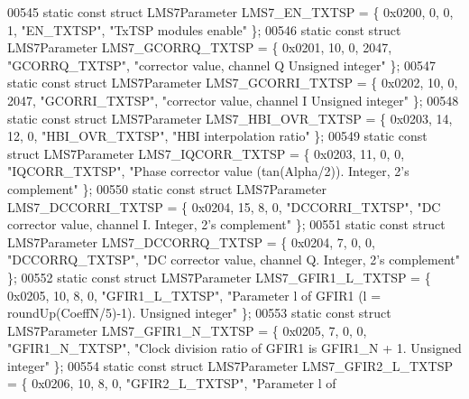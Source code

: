 \begin{DoxyCode}
00545 \textcolor{keyword}{static} \textcolor{keyword}{const} \textcolor{keyword}{struct }LMS7Parameter LMS7_EN_TXTSP = \{ 0x0200, 0, 0, 1, \textcolor{stringliteral}{"EN\_TXTSP"}, \textcolor{stringliteral}{"TxTSP modules enable"} \};
00546 \textcolor{keyword}{static} \textcolor{keyword}{const} \textcolor{keyword}{struct }LMS7Parameter LMS7_GCORRQ_TXTSP = \{ 0x0201, 10, 0, 2047, \textcolor{stringliteral}{"GCORRQ\_TXTSP"}, \textcolor{stringliteral}{"corrector
       value, channel Q Unsigned integer"} \};
00547 \textcolor{keyword}{static} \textcolor{keyword}{const} \textcolor{keyword}{struct }LMS7Parameter LMS7_GCORRI_TXTSP = \{ 0x0202, 10, 0, 2047, \textcolor{stringliteral}{"GCORRI\_TXTSP"}, \textcolor{stringliteral}{"corrector
       value, channel I Unsigned integer"} \};
00548 \textcolor{keyword}{static} \textcolor{keyword}{const} \textcolor{keyword}{struct }LMS7Parameter LMS7_HBI_OVR_TXTSP = \{ 0x0203, 14, 12, 0, \textcolor{stringliteral}{"HBI\_OVR\_TXTSP"}, \textcolor{stringliteral}{"HBI
       interpolation ratio"} \};
00549 \textcolor{keyword}{static} \textcolor{keyword}{const} \textcolor{keyword}{struct }LMS7Parameter LMS7_IQCORR_TXTSP = \{ 0x0203, 11, 0, 0, \textcolor{stringliteral}{"IQCORR\_TXTSP"}, \textcolor{stringliteral}{"Phase corrector
       value (tan(Alpha/2)). Integer, 2's complement"} \};
00550 \textcolor{keyword}{static} \textcolor{keyword}{const} \textcolor{keyword}{struct }LMS7Parameter LMS7_DCCORRI_TXTSP = \{ 0x0204, 15, 8, 0, \textcolor{stringliteral}{"DCCORRI\_TXTSP"}, \textcolor{stringliteral}{"DC corrector
       value, channel I. Integer, 2's complement"} \};
00551 \textcolor{keyword}{static} \textcolor{keyword}{const} \textcolor{keyword}{struct }LMS7Parameter LMS7_DCCORRQ_TXTSP = \{ 0x0204, 7, 0, 0, \textcolor{stringliteral}{"DCCORRQ\_TXTSP"}, \textcolor{stringliteral}{"DC corrector
       value, channel Q. Integer, 2's complement"} \};
00552 \textcolor{keyword}{static} \textcolor{keyword}{const} \textcolor{keyword}{struct }LMS7Parameter LMS7_GFIR1_L_TXTSP = \{ 0x0205, 10, 8, 0, \textcolor{stringliteral}{"GFIR1\_L\_TXTSP"}, \textcolor{stringliteral}{"Parameter l of
       GFIR1 (l = roundUp(CoeffN/5)-1). Unsigned integer"} \};
00553 \textcolor{keyword}{static} \textcolor{keyword}{const} \textcolor{keyword}{struct }LMS7Parameter LMS7_GFIR1_N_TXTSP = \{ 0x0205, 7, 0, 0, \textcolor{stringliteral}{"GFIR1\_N\_TXTSP"}, \textcolor{stringliteral}{"Clock division
       ratio of GFIR1 is GFIR1\_N + 1. Unsigned integer"} \};
00554 \textcolor{keyword}{static} \textcolor{keyword}{const} \textcolor{keyword}{struct }LMS7Parameter LMS7_GFIR2_L_TXTSP = \{ 0x0206, 10, 8, 0, \textcolor{stringliteral}{"GFIR2\_L\_TXTSP"}, \textcolor{stringliteral}{"Parameter l of
}
\end{DoxyCode}
